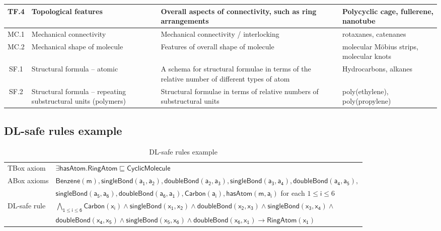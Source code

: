 \documentclass[10pt]{bmc_article}
\newenvironment{bmcformat}{\baselineskip20pt\sloppy\setboolean{publ}{false}}{\baselineskip20pt\sloppy}
\begin{document}
\begin{bmcformat}
{\begin{tabular}{|c|p{3cm}|p{5cm}|p{4cm}|}
        TF.4 & Topological features & Overall aspects of connectivity, such as ring arrangements & Polycyclic cage, fullerene, nanotube \\ \hline
        MC.1 & Mechanical connectivity & Mechanical connectivity / interlocking & rotaxanes, catenanes \\ \hline
        MC.2 & Mechanical shape of molecule & Features of overall shape of molecule & molecular M\"{o}bius strips, molecular knots  \\ \hline
        SF.1 & Structural formula -- atomic & A schema for structural formulae in terms of the relative number of different types of atom & Hydrocarbons, alkanes \\ \hline
        SF.2 & Structural formula -- repeating substructural units (polymers) & Structural formulae in terms of relative numbers of substructural units & poly(ethylene), poly(propylene) \\ \hline
      \end{tabular}
      } 


\subsection*{DL-safe rules example}
\begin{table}[h!]
\centering
\caption{DL-safe rules example}\label{tab:DL-safe-example}
\begin{tabular}{|l|l|}
    \hline
    TBox axiom    & $\mathsf{\exists hasAtom.RingAtom \sqsubseteq CyclicMolecule}$ \\
    ABox axioms & $\mathsf{Benzene(m),singleBond(a_1,a_2),doubleBond(a_2,a_3),singleBond(a_3,a_4),doubleBond(a_4,a_5),}$ \\ 
     & $\mathsf{singleBond(a_5,a_6),doubleBond(a_6,a_1),Carbon(a_i),hasAtom(m,a_i)}$  for each $ 1 \leq \mathsf{i} \leq 6$ \\
     DL-safe rule &  $\mathsf{ \bigwedge_{1 \leq i \leq 6}   Carbon(x_i)   \wedge singleBond(x_1,x_2) \wedge doubleBond(x_2,x_3) \wedge singleBond(x_3,x_4)} \wedge{}$ \\
     & $\mathsf{doubleBond(x_4,x_5) \wedge singleBond(x_5,x_6) \wedge doubleBond(x_6,x_1) \rightarrow RingAtom(x_1)}$ \\
      
     \hline 
\end{tabular}
\end{table}
%


\begin{comment}

\end{comment}
\end{bmcformat}
\end{document}
